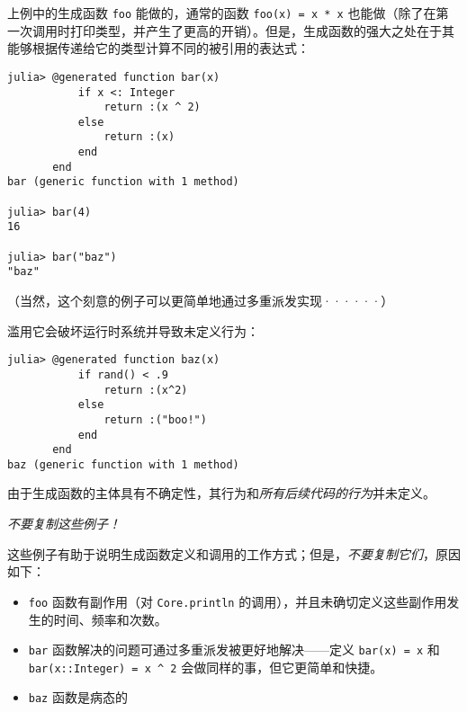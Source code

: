 上例中的生成函数 \texttt{foo} 能做的，通常的函数 \texttt{foo(x) = x * x} 也能做（除了在第一次调用时打印类型，并产生了更高的开销）。但是，生成函数的强大之处在于其能够根据传递给它的类型计算不同的被引用的表达式：




\begin{verbatim}
julia> @generated function bar(x)
           if x <: Integer
               return :(x ^ 2)
           else
               return :(x)
           end
       end
bar (generic function with 1 method)

julia> bar(4)
16

julia> bar("baz")
"baz"
\end{verbatim}



（当然，这个刻意的例子可以更简单地通过多重派发实现······）



滥用它会破坏运行时系统并导致未定义行为：




\begin{verbatim}
julia> @generated function baz(x)
           if rand() < .9
               return :(x^2)
           else
               return :("boo!")
           end
       end
baz (generic function with 1 method)
\end{verbatim}



由于生成函数的主体具有不确定性，其行为和\emph{所有后续代码的行为}并未定义。



\emph{不要复制这些例子！}



这些例子有助于说明生成函数定义和调用的工作方式；但是，\emph{不要复制它们}，原因如下：



\begin{itemize}
\item \texttt{foo} 函数有副作用（对 \texttt{Core.println} 的调用），并且未确切定义这些副作用发生的时间、频率和次数。


\item \texttt{bar} 函数解决的问题可通过多重派发被更好地解决——定义 \texttt{bar(x) = x} 和 \texttt{bar(x::Integer) = x {\textasciicircum} 2} 会做同样的事，但它更简单和快捷。


\item \texttt{baz} 函数是病态的

\end{itemize}


